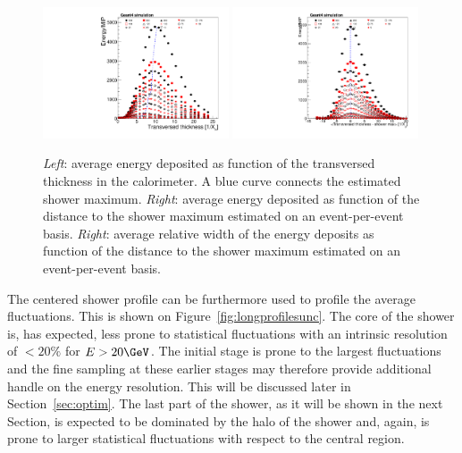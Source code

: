 \begin{figure}[h!]
  \begin{center}
   \includegraphics[width=0.49\textwidth]{figures/version_3_rawprof}
    \includegraphics[width=0.49\textwidth]{figures/version_3_cenprof}
    \caption{{\em Left}: average energy deposited as function of the
      transversed thickness in the calorimeter. A blue curve connects
      the estimated shower maximum.
     {\em Right}: average energy deposited as function of the distance
     to the shower maximum estimated on an event-per-event basis.
    {\em Right}: average relative width of the energy deposits as
    function of the distance to the shower maximum estimated on an event-per-event basis.
   }
    \label{fig:longprofiles}
  \end{center}
\end{figure}

The centered shower profile can be furthermore used to profile the
average fluctuations. This is shown on Figure~\ref{fig:longprofilesunc}.
The core of the shower is, has expected, less prone to statistical
fluctuations with an intrinsic resolution of $<20\%$ for
$E>20\GeV$.
The initial stage is prone to the largest fluctuations and the fine
sampling at these earlier stages may therefore provide additional handle on the energy
resolution. This will be discussed later in Section~\ref{sec:optim}.
The last part of the shower, as it will be shown in the next Section, is expected to
be dominated by the halo of the shower and, again, is prone to larger
statistical fluctuations with respect to the central region.


